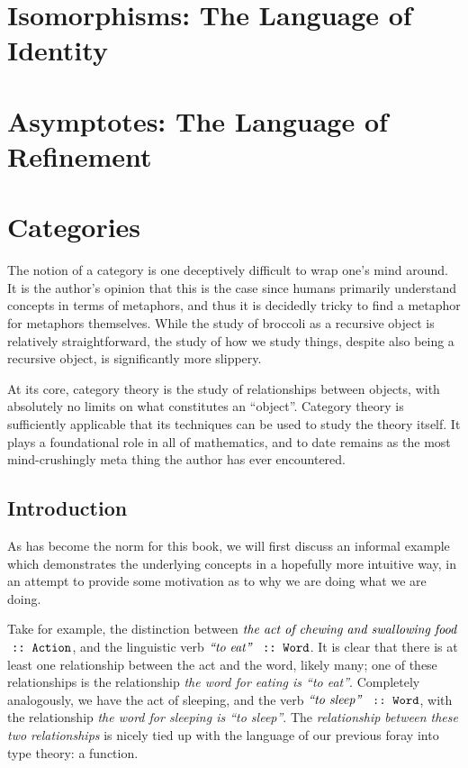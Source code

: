 \documentclass[12pt]{book}
\newcommand{\subtitle}[1]{}
\renewcommand{\value}[1]{\ensuremath{\text{\textit{#1}}}}
\newcommand{\type}[1]{\ensuremath{\text{\texttt{#1}}}}
\newcommand{\typeof}{\ensuremath{\text{ \texttt{::} }}}
\begin{document}
\chapter{Isomorphisms: The Language of Identity}
\chapter{Asymptotes: The Language of Refinement}

\chapter{Categories}
\subtitle{The Language of Metaphor}
The notion of a category is one deceptively difficult to wrap one's mind around. It is the author's opinion that this is
the case since humans primarily understand concepts in terms of metaphors, and thus it is decidedly tricky to find a
metaphor for metaphors themselves. While the study of broccoli as a recursive object is relatively straightforward, the
study of how we study things, despite also being a recursive object, is significantly more slippery.

At its core, category theory is the study of relationships between objects, with absolutely no limits on what
constitutes an ``object''. Category theory is sufficiently applicable that its techniques can be used to study the theory
itself. It plays a foundational role in all of mathematics, and to date remains as the most mind-crushingly meta thing
the author has ever encountered.

\newpage
\section{Introduction}

As has become the norm for this book, we will first discuss an informal example which demonstrates the underlying
concepts in a hopefully more intuitive way, in an attempt to provide some motivation as to why we are doing what we are
doing.

Take for example, the distinction between \value{the act of chewing and swallowing food} \typeof \type{Action}, and the
linguistic verb \value{``to eat''} \typeof \type{Word}. It is clear that there is at least one relationship between the
act and the word, likely many; one of these relationships is the relationship \textit{the word for eating is ``to eat''}.
Completely analogously, we have the act of sleeping, and the verb \value{``to sleep''} \typeof \type{Word}, with the
relationship \textit{the word for sleeping is ``to sleep''}. The \textit{relationship between these two relationships} is
nicely tied up with the language of our previous foray into type theory: a function.
\end{document}
